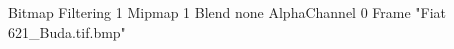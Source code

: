 {Bitmap
	{Filtering 1}
	{Mipmap 1}
	{Blend none}
	{AlphaChannel 0}
	{Frame "Fiat 621_Buda.tif.bmp"}
}
